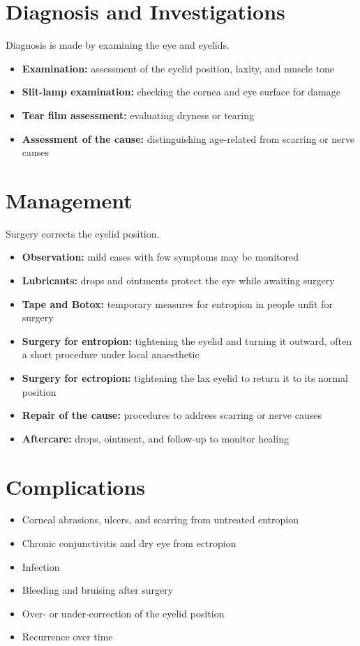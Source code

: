 \section*{Diagnosis and Investigations}
Diagnosis is made by examining the eye and eyelids.
\begin{itemize}
    \item \textbf{Examination:} assessment of the eyelid position, laxity, and muscle tone
    \item \textbf{Slit-lamp examination:} checking the cornea and eye surface for damage
    \item \textbf{Tear film assessment:} evaluating dryness or tearing
    \item \textbf{Assessment of the cause:} distinguishing age-related from scarring or nerve causes
\end{itemize}

\section*{Management}
Surgery corrects the eyelid position.
\begin{itemize}
    \item \textbf{Observation:} mild cases with few symptoms may be monitored
    \item \textbf{Lubricants:} drops and ointments protect the eye while awaiting surgery
    \item \textbf{Tape and Botox:} temporary measures for entropion in people unfit for surgery
    \item \textbf{Surgery for entropion:} tightening the eyelid and turning it outward, often a short procedure under local anaesthetic
    \item \textbf{Surgery for ectropion:} tightening the lax eyelid to return it to its normal position
    \item \textbf{Repair of the cause:} procedures to address scarring or nerve causes
    \item \textbf{Aftercare:} drops, ointment, and follow-up to monitor healing
\end{itemize}

\section*{Complications}
\begin{itemize}
    \item Corneal abrasions, ulcers, and scarring from untreated entropion
    \item Chronic conjunctivitis and dry eye from ectropion
    \item Infection
    \item Bleeding and bruising after surgery
    \item Over- or under-correction of the eyelid position
    \item Recurrence over time
\end{itemize}

